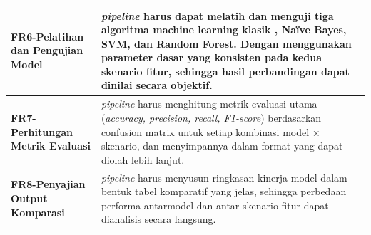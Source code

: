 \begin{longtable}{| p{3cm} | p{9cm} |}
    \hline
    \textbf{FR6-Pelatihan dan Pengujian Model} 
    & \textit{pipeline} harus dapat melatih dan menguji tiga algoritma machine learning klasik , Naïve Bayes, SVM, dan Random Forest. Dengan menggunakan parameter dasar yang konsisten pada kedua skenario fitur, sehingga hasil perbandingan dapat dinilai secara objektif. \\

    \hline
    \textbf{FR7-Perhitungan Metrik Evaluasi} 
    & \textit{pipeline} harus menghitung metrik evaluasi utama (\textit{accuracy, precision, recall, F1-score}) berdasarkan confusion matrix untuk setiap kombinasi model × skenario, dan menyimpannya dalam format yang dapat diolah lebih lanjut. \\

    \hline
    \textbf{FR8-Penyajian Output Komparasi} 
    & \textit{pipeline} harus menyusun ringkasan kinerja model dalam bentuk tabel komparatif yang jelas, sehingga perbedaan performa antarmodel dan antar skenario fitur dapat dianalisis secara langsung. \\

\end{longtable}